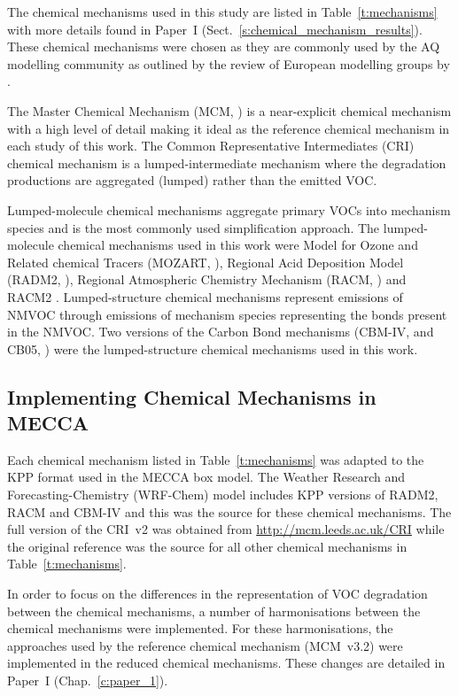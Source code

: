 The chemical mechanisms used in this study are listed in Table~\ref{t:mechanisms} with more details found in Paper~I (Sect.~\ref{s:chemical_mechanism_results}).
These chemical mechanisms were chosen as they are commonly used by the AQ modelling community as outlined by the review of European modelling groups by \citet{Baklanov:2014}.

The Master Chemical Mechanism (MCM, \citet{Jenkin:1997, Jenkin:2003, Saunders:2003, Bloss:2005, MCM_Site}) is a near-explicit chemical mechanism with a high level of detail making it ideal as the reference chemical mechanism in each study of this work.
The Common Representative Intermediates (CRI) chemical mechanism \citep{Jenkin:2008} is a lumped-intermediate mechanism where the degradation productions are aggregated (lumped) rather than the emitted VOC.

Lumped-molecule chemical mechanisms aggregate primary VOCs into mechanism species and is the most commonly used simplification approach.
The lumped-molecule chemical mechanisms used in this work were Model for Ozone and Related chemical Tracers (MOZART, \citet{Emmons:2010}), Regional Acid Deposition Model (RADM2, \citet{Stockwell:1990}), Regional Atmospheric Chemistry Mechanism (RACM, \citet{Stockwell:1997}) and RACM2 \citep{Goliff:2013}.
Lumped-structure chemical mechanisms represent emissions of NMVOC through emissions of mechanism species representing the bonds present in the NMVOC.
Two versions of the Carbon Bond mechanisms (CBM-IV, \citep{Gery:1989} and CB05, \citep{Yarwood:2005}) were the lumped-structure chemical mechanisms used in this work.

\newpage
\subsection{Implementing Chemical Mechanisms in MECCA} \label{s:mechanisms_MECCA}
Each chemical mechanism listed in Table~\ref{t:mechanisms} was adapted to the KPP format used in the MECCA box model.
The Weather Research and Forecasting-Chemistry (WRF-Chem) model \citep{Grell:2005} includes KPP versions of RADM2, RACM and CBM-IV and this was the source for these chemical mechanisms.
The full version of the CRI~v2 was obtained from \mbox{\url{http://mcm.leeds.ac.uk/CRI}} while the original reference was the source for all other chemical mechanisms in Table~\ref{t:mechanisms}.

In order to focus on the differences in the representation of VOC degradation between the chemical mechanisms, a number of harmonisations between the chemical mechanisms were implemented.
For these harmonisations, the approaches used by the reference chemical mechanism (MCM~v3.2) were implemented in the reduced chemical mechanisms.
These changes are detailed in Paper~I (Chap.~\ref{c:paper_1}). 

